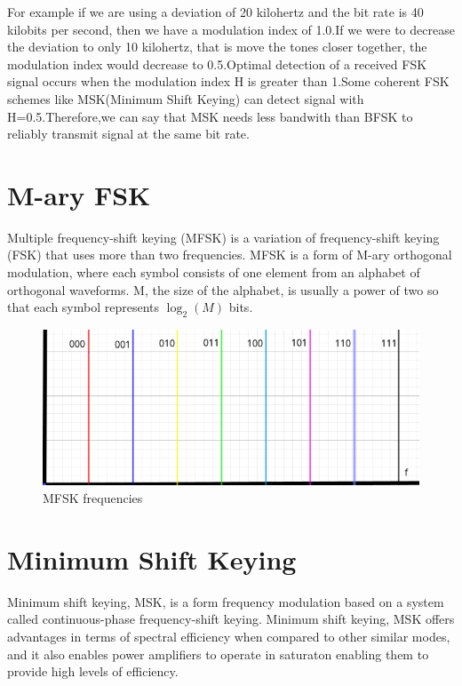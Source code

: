 \documentclass{report}
\begin{document}
{	 For example if we are using a deviation of 20 kilohertz and the bit rate is 40 kilobits per second, then we have a modulation index of 1.0.If we were to decrease the deviation to only 10 kilohertz, that is move the tones closer together, the modulation index would decrease to 0.5.Optimal detection of a received FSK signal occurs when the  modulation  index  H  is  greater  than  1.Some coherent FSK schemes like MSK(Minimum  Shift Keying) can detect signal with H=0.5.Therefore,we can say that MSK needs less bandwith than BFSK to reliably transmit signal at the same bit rate.
	 
}
	
	\section{M-ary FSK}
	\bigskip 
	Multiple frequency-shift keying (MFSK) is a variation of frequency-shift keying (FSK) that uses more than two frequencies. MFSK is a form of M-ary orthogonal modulation, where each symbol consists of one element from an alphabet of orthogonal waveforms. M, the size of the alphabet, is usually a power of two so that each symbol represents $\log_2(M)$ bits.
	
	\begin{figure}[H]
		\centering
		\includegraphics[width=\linewidth]{images/mfsk.png}
		\caption{MFSK frequencies}
		\label{fig:}
	\end{figure}

\newpage

	\section{Minimum Shift Keying}
	Minimum shift keying, MSK, is a form frequency modulation based on a system called continuous-phase frequency-shift keying.
	Minimum shift keying, MSK offers advantages in terms of spectral efficiency when compared to other similar modes, and it also enables power amplifiers to operate in saturaton enabling them to provide high levels of efficiency.\bigskip
	
\end{document}
